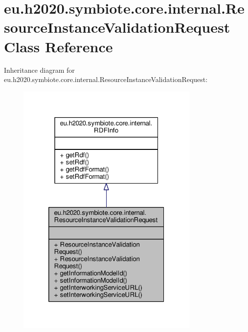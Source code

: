 \hypertarget{classeu_1_1h2020_1_1symbiote_1_1core_1_1internal_1_1ResourceInstanceValidationRequest}{}\section{eu.\+h2020.\+symbiote.\+core.\+internal.\+Resource\+Instance\+Validation\+Request Class Reference}
\label{classeu_1_1h2020_1_1symbiote_1_1core_1_1internal_1_1ResourceInstanceValidationRequest}


Inheritance diagram for eu.\+h2020.\+symbiote.\+core.\+internal.\+Resource\+Instance\+Validation\+Request\+:\nopagebreak
\begin{figure}[H]
\begin{center}
\leavevmode
\includegraphics[width=254pt]{classeu_1_1h2020_1_1symbiote_1_1core_1_1internal_1_1ResourceInstanceValidationRequest__inherit__graph}
\end{center}
\end{figure}


